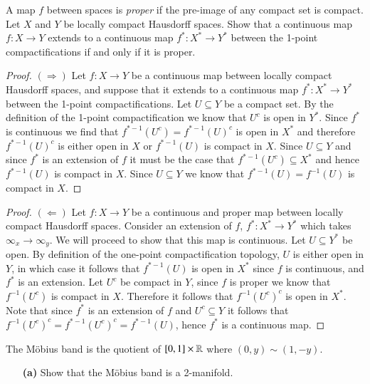 \documentclass{homework651}
\begin{document}
\begin{problems}

\problem A map $f$ between spaces is \emph{proper} if the pre-image of any compact set is compact. 
Let $X$ and $Y$ be locally compact Hausdorff spaces. Show that a continuous map $f: X \to Y$
extends to a continuous map $f^*:X^* \to Y^*$ between the 1-point compactifications if and only if 
it is proper. 

\begin{proof} $(\Rightarrow)$ Let $f: X \to Y$ be a continuous map between locally compact Hausdorff spaces, and suppose that it extends to a continuous 
    map $f^*:X^* \to Y^*$ between the 1-point compactifications. Let $U \subseteq Y$ be a compact set. By the definition of the 1-point compactification
    we know that $U^c$ is open in $Y^*$. Since $f^*$ is continuous we find that $f^{*-1}(U^c) = f^{*-1}(U)^c$ is open in $X^*$ and therefore $f^{*-1}(U)^c$
    is either open in $X$ or $f^{*-1}(U)$ is compact in $X$. Since $U \subseteq Y$ and since $f^*$ is an extension of $f$ 
    it must be the case that $f^{*-1}(U^c) \subseteq X^*$ and hence  $f^{*-1}(U)$ is compact in $X$. Since $U \subseteq Y$
    we know that $f^{*-1}(U) = f^{-1}(U)$ is compact in $X$. 
\end{proof}


\begin{proof}$(\Leftarrow)$ Let $f: X \to Y$ be a continuous and proper map between locally compact Hausdorff spaces.
    Consider an extension of $f$, $f^*: X^* \to Y^*$ which takes $\infty_x \to \infty_y$. We will proceed to show that this
    map is continuous. Let $U\subseteq Y^*$ be open. By definition of the one-point compactification topology, $U$ is either open 
    in $Y$, in which case it follows that $f^{*-1}(U)$ is open in $X^*$ since $f$ is continuous, and $f^*$ is an extension. 
    Let $U^c$ be compact in $Y$, since $f$ is proper we know that $f^{-1}(U^c)$ is compact in $X$. Therefore it follows that $f^{-1}(U^c)^c$
    is open in $X^*$. Note that since $f^*$ is an extension of $f$ and $U^c \subseteq Y$ it follows that $f^{-1}(U^c)^c = f^{*-1}(U^c)^c = f^{*-1}(U)$, 
    hence $f^*$ is a continuous map.  
\end{proof}


\problem The Möbius band is the quotient of $[0, 1] \times \RR$ where $(0, y) \sim (1, -y)$.
\begin{enumerate}
    \item[\textbf{(a)}] Show that the Möbius band is a 2-manifold. 


\end{enumerate}
\end{problems}
\end{document}
